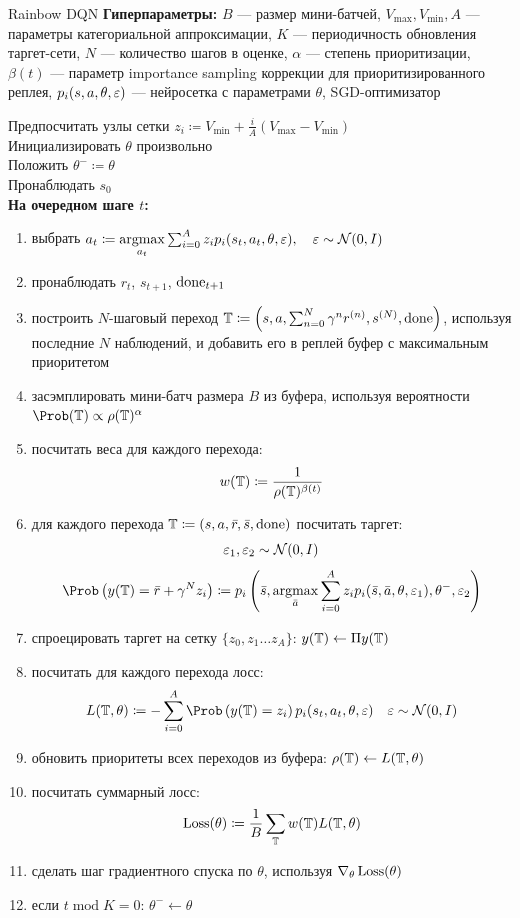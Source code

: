 \begin{algorithm}[label = rainbowalg]{Rainbow DQN}
\textbf{Гиперпараметры:} $B$ --- размер мини-батчей, $V_{\max}, V_{\min}, A$ --- параметры категориальной аппроксимации, $K$ --- периодичность обновления таргет-сети, $N$ --- количество шагов в оценке, $\alpha$ --- степень приоритизации, $\beta(t)$ --- параметр importance sampling коррекции для приоритизированного реплея, $p_i(s, a, \theta, \varepsilon)$ --- нейросетка с параметрами $\theta$, SGD-оптимизатор

\vspace{0.3cm}
Предпосчитать узлы сетки $z_i \coloneqq V_{\min} + \frac{i}{A}(V_{\max} - V_{\min})$ \\
Инициализировать $\theta$ произвольно \\
Положить $\theta^- \coloneqq \theta$ \\
Пронаблюдать $s_0$ \\
\textbf{На очередном шаге $t$:}
\begin{enumerate}
    \item выбрать $a_t \coloneqq \mathop{\mathrm{argmax}}\limits_{a_t} \sum_{i=0}^A z_i p_i(s_t, a_t, \theta, \varepsilon), \quad \varepsilon \sim \mathcal{N}(0, I)$
    \item пронаблюдать $r_t$, $s_{t+1}$, $\mathrm{done}_{t+1}$
    \item построить $N$-шаговый переход $\mathbb{T} \coloneqq \left( s, a, \sum_{n=0}^N \gamma^n r^{(n)}, s^{(N)}, \mathrm{done} \right)$, используя последние $N$ наблюдений, и добавить его в реплей буфер с максимальным приоритетом %
    \item засэмплировать мини-батч размера $B$ из буфера, используя вероятности $\Prob (\T) \propto \rho(\T)^\alpha$
    \item посчитать веса для каждого перехода:
    $$w(\mathbb{T}) \coloneqq \frac{1}{\rho(\mathbb{T})^{\beta(t)}}$$
    \item для каждого перехода $\mathbb{T} \coloneqq (s, a, \bar{r}, \bar{s}, \mathrm{done})$ посчитать таргет:
    $$\varepsilon_1, \varepsilon_2 \sim \mathcal{N}(0, I)$$
    $$\Prob \left( y(\T) = \bar{r} + \gamma^N z_i \right) \coloneqq p_i\left( \bar{s}, \argmax_{\bar{a}} \sum_{i=0}^A z_i p_i(\bar{s}, \bar{a}, \theta, \eps_1), \theta^-, \eps_2 \right)$$
    \item спроецировать таргет на сетку $\{ z_0, z_1 \dots z_{A} \}$: $y(\mathbb{T}) \leftarrow \Pi y(\mathbb{T})$ 
    \item посчитать для каждого перехода лосс:
    $$L(\T, \theta) \coloneqq -\sum_{i=0}^{A} \Prob \left( y(\T) = z_i \right) p_i(s_t, a_t, \theta, \eps) \quad \eps \sim \N(0, I)$$
    \item обновить приоритеты всех переходов из буфера: $\rho(\mathbb{T}) \gets L(\mathbb{T}, \theta)$
    \item посчитать суммарный лосс:
    $$\operatorname{Loss}(\theta) \coloneqq \frac{1}{B}\sum_{\mathbb{T}} w(\mathbb{T})L(\mathbb{T}, \theta)$$
    \item сделать шаг градиентного спуска по $\theta$, используя $\nabla_\theta \operatorname{Loss}(\theta)$
    \item если $t \operatorname{mod} K = 0$: $\theta^- \gets \theta$
\end{enumerate}
\end{algorithm}